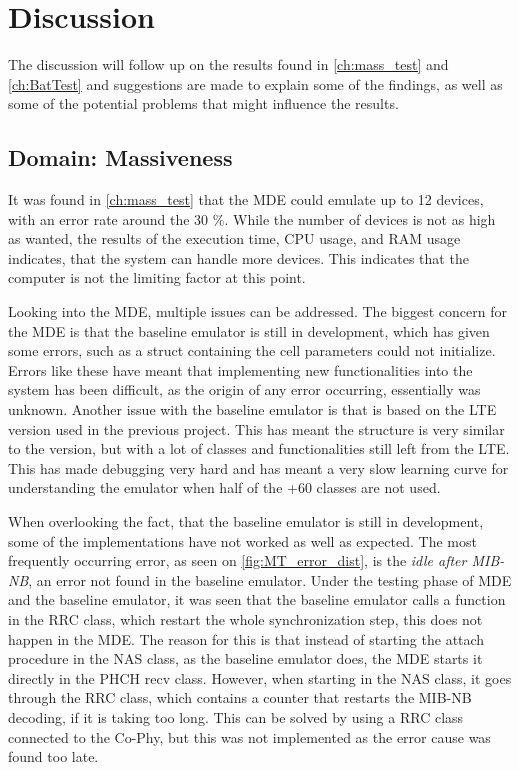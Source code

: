 \chapter{Discussion}
\label{ch:dics}
The discussion will follow up on the results found in \autoref{ch:mass_test} and \autoref{ch:BatTest} and suggestions are made to explain some of the findings, as well as some of the potential problems that might influence the results. 

\section{Domain: Massiveness}
It was found in \autoref{ch:mass_test} that the MDE could emulate up to 12 devices, with an error rate around the 30 $\%$. While the number of devices is not as high as wanted, the results of the execution time, CPU usage, and RAM usage indicates, that the system can handle more devices. This indicates that the computer is not the limiting factor at this point. 

Looking into the MDE, multiple issues can be addressed. The biggest concern for the MDE is that the baseline emulator is still in development, which has given some errors, such as a struct containing the cell parameters could not initialize. Errors like these have meant that implementing new functionalities into the system has been difficult, as the origin of any error occurring, essentially was unknown. Another issue with the baseline emulator is that is based on the LTE version used in the previous project. This has meant the structure is very similar to the version, but with a lot of classes and functionalities still left from the LTE. This has made debugging very hard and has meant a very slow learning curve for understanding the emulator when half of the +60 classes are not used.

When overlooking the fact, that the baseline emulator is still in development, some of the implementations have not worked as well as expected. The most frequently occurring error, as seen on \autoref{fig:MT_error_dist}, is the \textit{idle after MIB-NB}, an error not found in the baseline emulator. Under the testing phase of MDE and the baseline emulator, it was seen that the baseline emulator calls a function in the RRC class, which restart the whole synchronization step, this does not happen in the MDE. The reason for this is that instead of starting the attach procedure in the NAS class, as the baseline emulator does, the MDE starts it directly in the PHCH recv class. However, when starting in the NAS class, it goes through the RRC class, which contains a counter that restarts the MIB-NB decoding, if it is taking too long. This can be solved by using a RRC class connected to the Co-Phy, but this was not implemented as the error cause was found too late.

